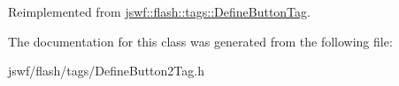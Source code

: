 Reimplemented from \hyperlink{classjswf_1_1flash_1_1tags_1_1_define_button_tag_ab984c03a3deccd5619922753ef43cff2}{jswf\+::flash\+::tags\+::\+Define\+Button\+Tag}.



The documentation for this class was generated from the following file\+:\begin{DoxyCompactItemize}
\item 
jswf/flash/tags/Define\+Button2\+Tag.\+h\end{DoxyCompactItemize}
